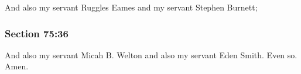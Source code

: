 		And also my servant Ruggles Eames and my servant Stephen Burnett;


	\subsubsection{Section 75:36} %
		\label{DC75-36}

		And also my servant Micah B. Welton and also my servant Eden Smith.  Even so.  Amen.

